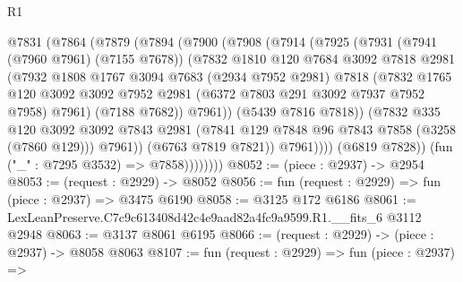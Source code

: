 \begin{lexlean}{R1}
\begin{coremodule}
                  @7831
                    (@7864
                      (@7879
                        (@7894
                          (@7900
                            (@7908
                              (@7914
                                (@7925
                                  (@7931
                                    (@7941 (@7960 @7961) (@7155 @7678))
                                    (@7832
                                      @1810
                                      @120
                                      @7684
                                      @3092
                                      @7818
                                      @2981
                                      (@7932
                                        @1808
                                        @1767
                                        @3094
                                        @7683
                                        (@2934 @7952 @2981)
                                        @7818
                                        (@7832
                                          @1765
                                          @120
                                          @3092
                                          @3092
                                          @7952
                                          @2981
                                          (@6372 @7803 @291 @3092 @7937 @7952 @7958)
                                          @7961)
                                        (@7188 @7682))
                                      @7961))
                                  (@5439 @7816 @7818))
                                (@7832
                                  @335
                                  @120
                                  @3092
                                  @3092
                                  @7843
                                  @2981
                                  (@7841 @129 @7848 @96 @7843 @7858 (@3258 (@7860 @129)))
                                  @7961))
                              (@6763 @7819 @7821))
                            @7961))))
                    (@6819 @7828))
                  (fun ("_" : @7295 @3532) => @7858))))))))
@8052 := (piece : @2937) -> @2954
@8053 := (request : @2929) -> @8052
@8056 := fun (request : @2929) => fun (piece : @2937) => @3475 @6190
@8058 := @3125 @172 @6186
@8061 := LexLeanPreserve.C7c9c613408d42c4e9aad82a4fc9a9599.R1.__fits_6 @3112 @2948
@8063 := @3137 @8061 @6195
@8066 := (request : @2929) -> (piece : @2937) -> @8058 @8063
@8107 := fun (request : @2929) =>
  fun (piece : @2937) =>

\end{coremodule}
\end{lexlean}
